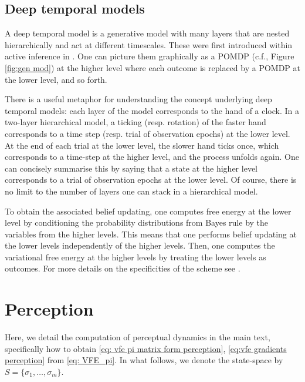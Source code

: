 \documentclass[review,12pt,authoryear]{elsarticle}
\begin{document}
\subsection{Deep temporal models}
\label{appendix: deep temporal models}

A deep temporal model is a generative model with many layers that are nested hierarchically and act at different timescales. These were first introduced within active inference in \citep{fristonActiveInferenceCuriosity2017}. One can picture them graphically as a POMDP (c.f., Figure \ref{fig:gen mod}) at the higher level where each outcome is replaced by a POMDP at the lower level, and so forth.

There is a useful metaphor for understanding the concept underlying deep temporal models: each layer of the model corresponds to the hand of a clock. In a two-layer hierarchical model, a ticking (resp. rotation) of the faster hand corresponds to a time step (resp. trial of observation epochs) at the lower level. At the end of each trial at the lower level, the slower hand ticks once, which corresponds to a time-step at the higher level, and the process unfolds again. One can concisely summarise this by saying that a state at the higher level corresponds to a trial of observation epochs at the lower level. Of course, there is no limit to the number of layers one can stack in a hierarchical model.

To obtain the associated belief updating, one computes free energy at the lower level by conditioning the probability distributions from Bayes rule by the variables from the higher levels. This means that one performs belief updating at the lower levels independently of the higher levels. Then, one computes the variational free energy at the higher levels by treating the lower levels as outcomes. For more details on the specificities of the scheme see \citep{fristonActiveInferenceCuriosity2017}.


\section{Perception}
\label{app: deriving perceptual dynamics}

Here, we detail the computation of perceptual dynamics in the main text, specifically how to obtain \eqref{eq: vfe pi matrix form perception}, \eqref{eq:vfe gradients perception} from \eqref{eq: VFE_pi}. In what follows, we denote the state-space by $S=\{\sigma_1,\ldots , \sigma_m\}$.
\end{document}
